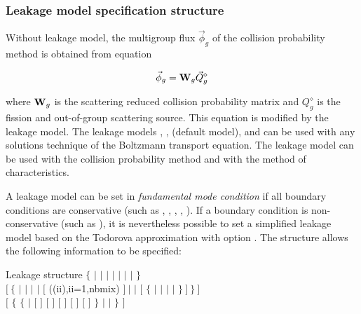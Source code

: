 \subsubsection{Leakage model specification structure}\label{sect:descleak}

Without leakage model, the multigroup flux $\vec\phi_g$ of the collision
probability method is obtained from equation

\begin{equation}
\vec\phi_g={\bf W}_g \vec Q^\diamond_g
\label{eq:eq3.64}
\end{equation}

\noindent where ${\bf W}_g$ is the scattering reduced collision probability matrix
and $ Q^\diamond_g$ is the fission and out-of-group scattering source. This equation is
modified by the leakage model. The leakage models , , 
(default model),  and  can be used with any solutions technique of
the Boltzmann transport equation. The leakage model  can be used with the collision
probability method and with the method of characteristics.

\vskip 0.2cm

A leakage model can be set in {\sl fundamental mode condition} if all boundary conditions are
conservative (such as , , , , ). If a boundary condition is
non-conservative (such as ), it is nevertheless possible to set a simplified leakage model based on the
Todorova approximation with option . The  structure allows the following
information to be specified:

\begin{DataStructure}{Leakage structure }
$\{$  $|$  $|$  $|$  $|$  $|$  $|$  $|$  $\}$ \\
$[~\{$  $|$  $|$  $|$  $|$  $[$ ((ii),ii=1,nbmix) $]~|$  $|$ 
$[$ $\{$  $|$  $|$  $|$  $|$  $\}~]~\}~]$ \\
$[$ $\{$  $\{$  $|$ $[$   $]$  
$[$   $]$ $[$   $]$ 
$[$   $]$
$[$   $]$ $\}$
$|$   $|$  $\}$
$]$  \end{DataStructure}

